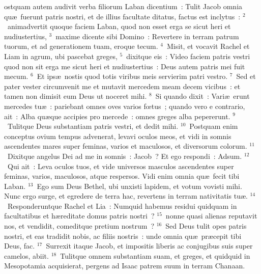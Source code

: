 \bchapter
{}ostquam autem audivit verba filiorum Laban dicentium~: Tulit Jacob omnia qu\ae\ fuerunt patris nostri, et de illius facultate ditatus, factus est inclytus~:
${}^{2}$~animadvertit quoque faciem Laban, quod non esset erga se sicut heri et nudiustertius,
${}^{3}$~maxime dicente sibi Domino~: Revertere in terram patrum tuorum, et ad generationem tuam, eroque tecum.
${}^{4}$~Misit, et vocavit Rachel et Liam in agrum, ubi pascebat greges,
${}^{5}$~dixitque eis~: Video faciem patris vestri quod non sit erga me sicut heri et nudiustertius~: Deus autem patris mei fuit mecum.
${}^{6}$~Et ips\ae\ nostis quod totis viribus meis servierim patri vestro.
${}^{7}$~Sed et pater vester circumvenit me et mutavit mercedem meam decem vicibus~: et tamen non dimisit eum Deus ut noceret mihi.
${}^{8}$~Si quando dixit~: Vari\ae\ erunt mercedes tu\ae~: pariebant omnes oves varios fœtus~; quando vero e contrario, ait~: Alba qu\ae que accipies pro mercede~: omnes greges alba pepererunt.
${}^{9}$~Tulitque Deus substantiam patris vestri, et dedit mihi.
${}^{10}$~Postquam enim conceptus ovium tempus advenerat, levavi oculos meos, et vidi in somnis ascendentes mares super feminas, varios et maculosos, et diversorum colorum.
${}^{11}$~Dixitque angelus Dei ad me in somnis~: Jacob~? Et ego respondi~: Adsum.
${}^{12}$~Qui ait~: Leva oculos tuos, et vide universos masculos ascendentes super feminas, varios, maculosos, atque respersos. Vidi enim omnia qu\ae\ fecit tibi Laban.
${}^{13}$~Ego sum Deus Bethel, ubi unxisti lapidem, et votum vovisti mihi. Nunc ergo surge, et egredere de terra hac, revertens in terram nativitatis tu\ae .
${}^{14}$~Responderuntque Rachel et Lia~: Numquid habemus residui quidquam in facultatibus et h\ae reditate domus patris nostri~?
${}^{15}$~nonne quasi alienas reputavit nos, et vendidit, comeditque pretium nostrum~?
${}^{16}$~Sed Deus tulit opes patris nostri, et eas tradidit nobis, ac filiis nostris~: unde omnia qu\ae\ pr\ae cepit tibi Deus, fac.
${}^{17}$~Surrexit itaque Jacob, et impositis liberis ac conjugibus suis super camelos, abiit.
${}^{18}$~Tulitque omnem substantiam suam, et greges, et quidquid in Mesopotamia acquisierat, pergens ad Isaac patrem suum in terram Chanaan.



